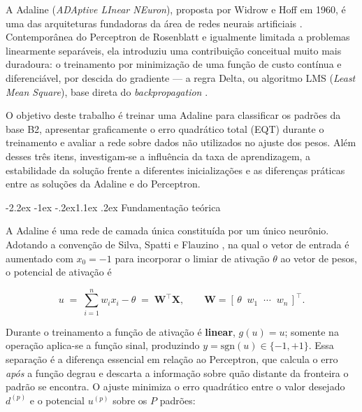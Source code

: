 \documentclass[12pt,a4paper]{article}
\makeatletter
\renewcommand\section{\@startsection{section}{1}{\z@}%
  {-2.2ex \@plus -1ex \@minus -.2ex}{1.1ex \@plus .2ex}%
  {\normalfont\large\bfseries}}
\makeatother
\begin{document}
A Adaline (\textit{ADAptive LInear NEuron}), proposta por Widrow e Hoff em 1960,
\'e uma das arquiteturas fundadoras da \'area de redes neurais artificiais
\cite{widrow1960}. Contempor\^anea do Perceptron de Rosenblatt e igualmente limitada
a problemas linearmente separ\'aveis, ela introduziu uma contribui\c{c}\~ao
conceitual muito mais duradoura: o treinamento por minimiza\c{c}\~ao de uma
fun\c{c}\~ao de custo cont\'inua e diferenci\'avel, por descida do gradiente ---
a regra Delta, ou algoritmo LMS (\textit{Least Mean Square}), base direta do
\textit{backpropagation} \cite{widrow1990,haykin2001}.

O objetivo deste trabalho \'e treinar uma Adaline para classificar os padr\~oes da
base B2, apresentar graficamente o erro quadr\'atico total (EQT) durante o
treinamento e avaliar a rede sobre dados n\~ao utilizados no ajuste dos pesos.
Al\'em desses tr\^es itens, investigam-se a influ\^encia da taxa de aprendizagem, a
estabilidade da solu\c{c}\~ao frente a diferentes inicializa\c{c}\~oes e as
diferen\c{c}as pr\'aticas entre as solu\c{c}\~oes da Adaline e do Perceptron.

\section{Fundamenta\c{c}\~ao te\'orica}
\label{sec:fund}

A Adaline \'e uma rede de camada \'unica constitu\'ida por um \'unico neur\^onio.
Adotando a conven\c{c}\~ao de Silva, Spatti e Flauzino \cite{silva2016}, na qual o
vetor de entrada \'e aumentado com $x_0 = -1$ para incorporar o limiar de
ativa\c{c}\~ao $\theta$ ao vetor de pesos, o potencial de ativa\c{c}\~ao \'e

\begin{equation}
u \;=\; \sum_{i=1}^{n} w_i x_i - \theta \;=\; \mathbf{W}^{\top}\mathbf{X},
\qquad
\mathbf{W} = [\,\theta\;\;w_1\;\;\cdots\;\;w_n\,]^{\top}.
\label{eq:u}
\end{equation}

Durante o treinamento a fun\c{c}\~ao de ativa\c{c}\~ao \'e \textbf{linear},
$g(u) = u$; somente na opera\c{c}\~ao aplica-se a fun\c{c}\~ao sinal, produzindo
$y = \mathrm{sgn}(u) \in \{-1,+1\}$. Essa separa\c{c}\~ao \'e a diferen\c{c}a
essencial em rela\c{c}\~ao ao Perceptron, que calcula o erro \emph{ap\'os} a
fun\c{c}\~ao degrau e descarta a informa\c{c}\~ao sobre qu\~ao distante da fronteira
o padr\~ao se encontra. O ajuste minimiza o erro quadr\'atico entre o valor
desejado $d^{(p)}$ e o potencial $u^{(p)}$ sobre os $P$ padr\~oes:
\end{document}
